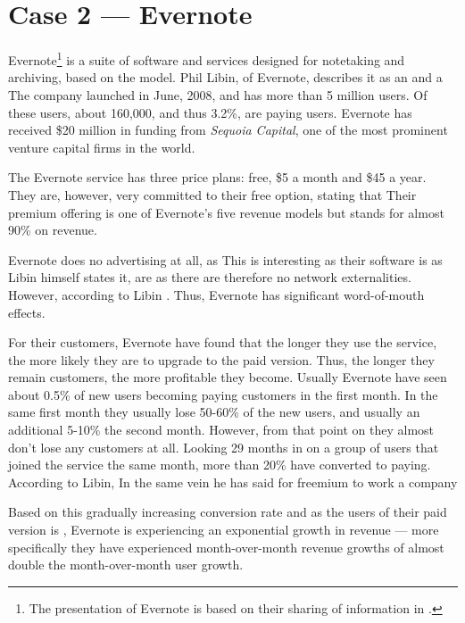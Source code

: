 \section{Case 2 --- Evernote}

Evernote\footnote{The presentation of Evernote is based on their sharing of information in \citet{libin2010,libin2010b,libin2010c,libin2010d,libin2010e,grove2010,darlin2009,sattersten2010}.} is a suite of software and services designed for notetaking and archiving, based on the  model. Phil Libin,  of Evernote, describes it as an  and a  The company launched in June, 2008, and has more than 5 million users. Of these users, about 160,000, and thus 3.2\%, are paying users. Evernote has received \$20 million  in funding from \emph{Sequoia Capital}, one of the most prominent venture capital firms in the world.

The Evernote service has three price plans: free, \$5 a month and \$45 a year. They are, however, very committed to their free option, stating that  Their premium offering is one of Evernote's five revenue models but stands for almost 90\% on revenue.

Evernote does no advertising at all, as  This is interesting as their software is  as Libin himself states it, are as there are therefore no network externalities. However, according to Libin . Thus, Evernote has significant word-of-mouth effects.

For their customers, Evernote have found that the longer they use the service, the more likely they are to upgrade to the paid version. Thus, the longer they remain customers, the more profitable they become. Usually Evernote have seen about 0.5\% of new users becoming paying customers in the first month. In the same first month they usually lose 50-60\% of the new users, and usually an additional 5-10\% the second month. However, from that point on they almost don't lose any customers at all. Looking 29 months in on a group of users that joined the service the same month, more than 20\% have converted to paying. According to Libin,  In the same vein he has said for freemium to work a company 

Based on this gradually increasing conversion rate and as the users of their paid version is , Evernote is experiencing an exponential growth in revenue --- more specifically they have experienced month-over-month revenue growths of almost double the month-over-month user growth.

